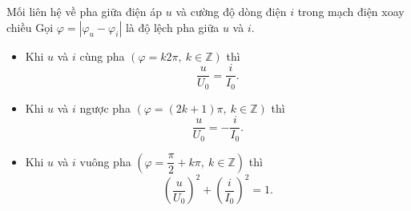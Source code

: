 \begin{dang}{Mối liên hệ về pha giữa điện áp $u$ và cường độ dòng điện $i$ trong mạch điện xoay chiều}
		Gọi $\varphi=\left|\varphi_u-\varphi_i\right|	$ là độ lệch pha giữa $u$ và $i$.
		\begin{itemize}
			\item Khi $u$ và $i$ cùng pha $\left(\varphi=k2\pi,\ k\in \mathbb{Z}\right)$ thì
			$$\dfrac{u}{U_0}=\dfrac{i}{I_0}.$$
			\item Khi $u$ và $i$ ngược pha $\left(\varphi=\left(2k+1\right)\pi,\ k\in \mathbb{Z}\right)$ thì
			$$\dfrac{u}{U_0}=-\dfrac{i}{I_0}.$$
			\item Khi $u$ và $i$ vuông pha $\left(\varphi=\dfrac{\pi}{2}+k\pi,\ k\in \mathbb{Z}\right)$ thì
			$$\left(\dfrac{u}{U_0}\right)^2+\left(\dfrac{i}{I_0}\right)^2=1.$$
		\end{itemize}
\end{dang}
